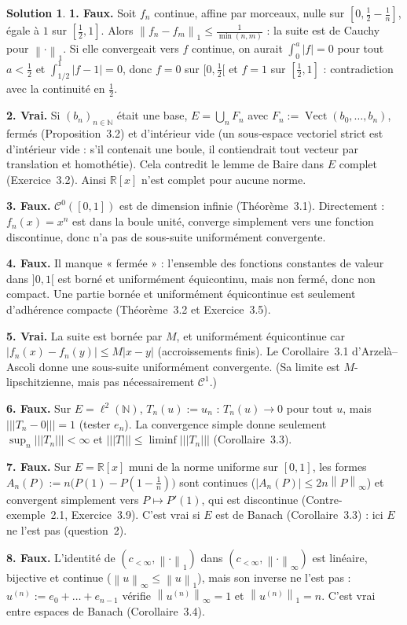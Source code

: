 \documentclass[11pt,a4paper]{article}
\newcommand{\R}{\mathbb{R}}
\newcommand{\N}{\mathbb{N}}
\newcommand{\Vect}{\operatorname{Vect}}
\newcommand{\norm}[1]{\left\|#1\right\|}
\newcommand{\opnorm}[1]{|\!|\!|#1|\!|\!|}
\newcommand{\Cz}{\mathcal{C}^0}
\theoremstyle{definition}
\newtheorem*{solution}{Solution}
\begin{document}
\begin{solution}
\noindent\textbf{1. Faux.} Soit $f_n$ continue, affine par morceaux, nulle sur $[0,\frac12-\frac1n]$, égale à $1$ sur $[\frac12,1]$. Alors $\norm{f_n-f_m}_1\le\frac1{\min(n,m)}$ : la suite est de Cauchy pour $\norm\cdot_1$. Si elle convergeait vers $f$ continue, on aurait $\int_0^a|f|=0$ pour tout $a<\frac12$ et $\int_{1/2}^1|f-1|=0$, donc $f=0$ sur $[0,\frac12[$ et $f=1$ sur $[\frac12,1]$ : contradiction avec la continuité en $\frac12$.

\medskip
\noindent\textbf{2. Vrai.} Si $(b_n)_{n\in\N}$ était une base, $E=\bigcup_nF_n$ avec $F_n:=\Vect(b_0,\dots,b_n)$, fermés (Proposition~3.2) et d'intérieur vide (un sous-espace vectoriel strict est d'intérieur vide : s'il contenait une boule, il contiendrait tout vecteur par translation et homothétie). Cela contredit le lemme de Baire dans $E$ complet (Exercice~3.2). Ainsi $\R[x]$ n'est complet pour aucune norme.

\medskip
\noindent\textbf{3. Faux.} $\Cz([0,1])$ est de dimension infinie (Théorème~3.1). Directement : $f_n(x)=x^n$ est dans la boule unité, converge simplement vers une fonction discontinue, donc n'a pas de sous-suite uniformément convergente.

\medskip
\noindent\textbf{4. Faux.} Il manque « fermée » : l'ensemble des fonctions constantes de valeur dans $]0,1[$ est borné et uniformément équicontinu, mais non fermé, donc non compact. Une partie bornée et uniformément équicontinue est seulement d'adhérence compacte (Théorème~3.2 et Exercice~3.5).

\medskip
\noindent\textbf{5. Vrai.} La suite est bornée par $M$, et uniformément équicontinue car $|f_n(x)-f_n(y)|\le M|x-y|$ (accroissements finis). Le Corollaire~3.1 d'Arzelà--Ascoli donne une sous-suite uniformément convergente. (Sa limite est $M$-lipschitzienne, mais pas nécessairement $\mathcal C^1$.)

\medskip
\noindent\textbf{6. Faux.} Sur $E=\ell^2(\N)$, $T_n(u):=u_n$ : $T_n(u)\to0$ pour tout $u$, mais $\opnorm{T_n-0}=1$ (tester $e_n$). La convergence simple donne seulement $\sup_n\opnorm{T_n}<\infty$ et $\opnorm T\le\liminf\opnorm{T_n}$ (Corollaire~3.3).

\medskip
\noindent\textbf{7. Faux.} Sur $E=\R[x]$ muni de la norme uniforme sur $[0,1]$, les formes $A_n(P):=n\big(P(1)-P(1-\frac1n)\big)$ sont continues ($|A_n(P)|\le2n\norm P_\infty$) et convergent simplement vers $P\mapsto P'(1)$, qui est discontinue (Contre-exemple~2.1, Exercice~3.9). C'est vrai si $E$ est de Banach (Corollaire~3.3) : ici $E$ ne l'est pas (question~2).

\medskip
\noindent\textbf{8. Faux.} L'identité de $(c_{<\infty},\norm\cdot_1)$ dans $(c_{<\infty},\norm\cdot_\infty)$ est linéaire, bijective et continue ($\norm u_\infty\le\norm u_1$), mais son inverse ne l'est pas : $u^{(n)}:=e_0+\dots+e_{n-1}$ vérifie $\norm{u^{(n)}}_\infty=1$ et $\norm{u^{(n)}}_1=n$. C'est vrai entre espaces de Banach (Corollaire~3.4).
\end{solution}
\end{document}
